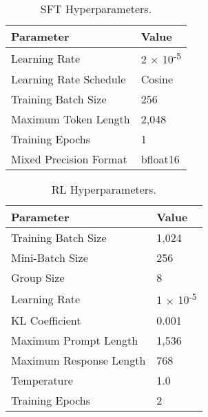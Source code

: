 \begin{minipage}{0.48\textwidth}
    \begin{table}[H]
    \small
    \centering
    \caption{SFT Hyperparameters.}
    \label{tab:sft_hyper}
    \vspace{3mm}
    \begin{tabular}{ll}
    \toprule
    \textbf{Parameter}           & \textbf{Value}      \\ \midrule
    Learning Rate                & 2 $\times$ 10\textsuperscript{-5} \\
    Learning Rate Schedule       & Cosine             \\
    Training Batch Size         & 256                \\
    Maximum Token Length         & 2,048              \\
    Training Epochs              & 1                  \\
    Mixed Precision Format       & bfloat16           \\ \bottomrule
    \end{tabular}
    \end{table}
\end{minipage}
\hfill
\begin{minipage}{0.48\textwidth}
    \begin{table}[H]
    \small
    \centering
    \caption{RL Hyperparameters.}
    \label{tab:rl_hyper}
    \vspace{3mm}
    \begin{tabular}{ll}
    \toprule
    \textbf{Parameter}           & \textbf{Value}      \\ \midrule
    Training Batch Size          & 1,024              \\
    Mini-Batch Size          & 256                \\
    Group Size & 8 \\
    Learning Rate                & 1 $\times$ 10\textsuperscript{-5} \\
    KL Coefficient               & 0.001              \\
    Maximum Prompt Length        & 1,536              \\
    Maximum Response Length      & 768                \\
    Temperature & 1.0 \\
    Training Epochs              & 2                  \\ \bottomrule
    \end{tabular}
    \end{table}
\end{minipage}

